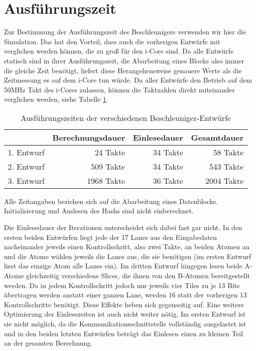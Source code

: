 \section{Ausführungszeit}
Zur Bestimmung der Ausführungszeit des Beschleunigers verwenden wir hier die Simulation. Das hat den Vorteil,
dass auch die vorherigen Entwürfe mit verglichen werden können, die zu groß für den i-Core sind.
Da alle Entwürfe statisch sind in ihrer Ausführungszeit, die Abarbeitung eines Blocks also immer die gleiche Zeit benötigt,
liefert diese Herangehensweise genauere Werte als die Zeitmessung es auf dem i-Core tun würde.
Da aller Entwürfe den Betrieb auf dem 50MHz Takt des i-Cores zulassen, können die Taktzahlen direkt miteinander verglichen werden, siehe Tabelle \ref{tab:zeiten_alle_iterationen}.
\begin{table}
    \centering
    \begin{tabular}{lrrr}
        & Berechnungsdauer & Einlesedauer & Gesamtdauer\\
        \hline
        1. Entwurf & 24 Takte & 34 Takte & 58 Takte \\
        2. Entwurf & 509 Takte & 34 Takte & 543 Takte \\
        3. Entwurf & 1968 Takte & 36 Takte & 2004 Takte
    \end{tabular}
    \label{tab:zeiten_alle_iterationen}
    \caption{Ausführungszeiten der verschiedenen Beschleuniger-Entwürfe}
    \small Alle Zeitangaben beziehen sich auf die Abarbeitung eines Datenblocks. Initialisierung und Auslesen des Hashs sind nicht einberechnet.
\end{table}
Die Einlesedauer der Iterationen unterscheidet sich dabei fast gar nicht. In den ersten beiden Entwürfen liegt jede der 17 Lanes aus den Eingabedaten
nacheinander jeweils einen Kontrollschritt, also zwei Takte, an beiden Atomen an und die Atome wählen jeweils die Lanes aus, die sie benötigen
(im ersten Entwurf liest das einzige Atom alle Lanes ein).
Im dritten Entwurf hingegen lesen beide A-Atome gleichzeitig verschiedene Slices, die ihnen von den B-Atomen bereitgestellt werden.
Da in jedem Kontrollschritt jedoch nur jeweils vier Tiles zu je 13 Bits übertragen werden anstatt einer ganzen Lane, werden 16 statt der vorherigen 13 Kontrollschritte benötigt.
Diese Effekte heben sich gegenseitig auf. Eine weitere Optimierung der Einlesezeiten ist auch nicht weiter nötig. Im ersten Entwurf ist sie nicht möglich,
da die Kommunikationsschnittstelle vollständig ausgelastet ist und in den beiden letzten Entwürfen beträgt das Einlesen einen zu kleinen Teil an der gesamten Berechnung.

